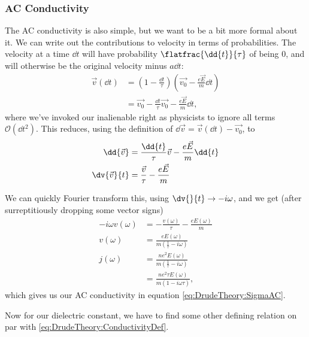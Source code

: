 \documentclass[../../main.tex]{subfiles}
\begin{document}
\subsubsection{AC Conductivity} 

The AC conductivity is also simple, but we want to be a bit more formal about it. We can write out the contributions to velocity in terms of probabilities. The velocity at a time $\dd{t}$ will have probability $\flatfrac{\dd{t}}{\tau}$ of being $0$, and will otherwise be the original velocity minus $a \dd{t}$:
\begin{align}
	\vec{v}(\dd{t}) &= \left(1 - \frac{\dd{t}}{\tau}\right) \left(\vec{v_0} - \frac{e \vec{E}}{m} \dd{t} \right) \\
	&= \vec{v_0} - \frac{\dd{t}}{\tau}\vec{v_0} - \frac{e \vec{E}}{m} \dd{t},
\end{align}
where we've invoked our inalienable right as physicists to ignore all terms $\mathcal{O}(\dd{t}^2)$.
This reduces, using the definition of $\dd{\vec{v}} = \vec{v}(\dd{t}) - \vec{v_0}$, to
\begin{align}
	\dd{\vec{v}} &=  \frac{\dd{t}}{\tau} \vec{v} - \frac{e \vec{E}}{m} \dd{t} \\
	\dv{\vec{v}}{t} &= \frac{\vec{v}}{\tau} - \frac{e \vec{E}}{m}
\end{align}

We can quickly Fourier transform this, using $\dv{}{t} \rightarrow -i \omega$, and we get (after surreptitiously dropping some vector signs)
\begin{align}
	-i \omega v(\omega) &= - \frac{v(\omega)}{\tau} - \frac{e E(\omega)}{m} \\
	v(\omega) &= \frac{e E(\omega)}{m \left(\frac{1}{\tau} - i\omega \right)} \\
	j(\omega) &= \frac{n e^2 E(\omega)}{m \left(\frac{1}{\tau} - i\omega \right)} \\
	&= \frac{n e^2 \tau E(\omega)}{m \left(1 - i\omega \tau \right)}, 
\end{align}
which gives us our AC conductivity in equation \eqref{eq:DrudeTheory:SigmaAC}.

Now for our dielectric constant, we have to find some other defining relation on par with \eqref{eq:DrudeTheory:ConductivityDef}.
\end{document}
